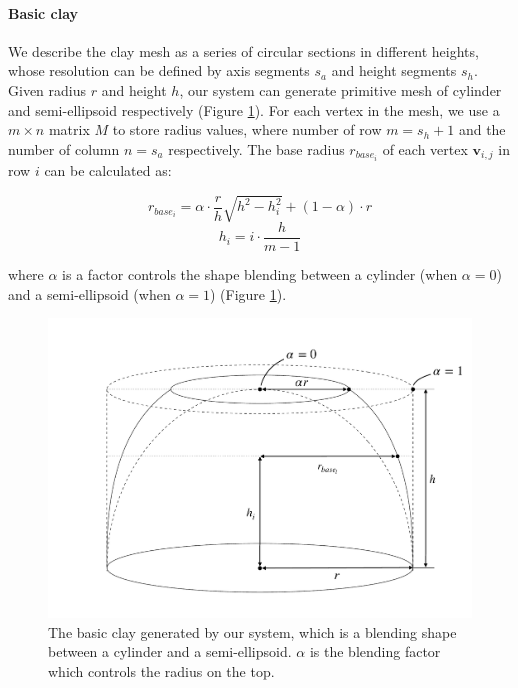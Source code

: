 \paragraph{Basic clay} We describe the clay mesh as a series of circular sections in different heights, whose resolution can be defined by axis segments $s_{a}$ and height segments $s_{h}$. Given radius $r$ and height $h$, our system can generate primitive mesh of cylinder and semi-ellipsoid respectively (Figure \ref{fig:3}).
For each vertex in the mesh, we use a $m \times n$ matrix $M$ to store radius values, where number of row $m = s_{h} + 1$ and the number of column $n = s_{a}$ respectively. The base radius $r_{base_{i}}$ of each vertex $\mathbf{v}_{i,j}$ in row $i$ can be calculated as: 

\begin{equation}
r_{base_{i}} = \alpha \cdot \frac{r}{h} \sqrt{h^2 -  h_{i}^2} + (1 - \alpha) \cdot r
\end{equation}
\begin{equation}
h_{i} = i \cdot \frac{h}{m-1}
\end{equation}

where $\alpha$ is a factor controls the shape blending between a  cylinder (when $\alpha=0$) and a semi-ellipsoid (when $\alpha=1$) (Figure \ref{fig:3}).

\begin{figure}
\includegraphics[width=\textwidth]{fig3.pdf}
\caption{The basic clay generated by our system, which is a blending shape between a cylinder and a semi-ellipsoid. $\alpha$ is the blending factor which controls the radius on the top.}
\label{fig:3}
\end{figure}

